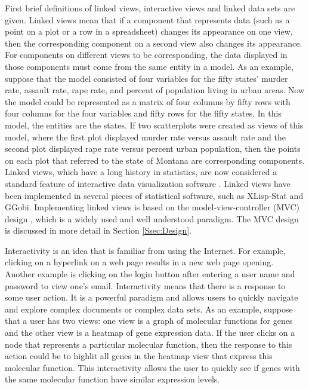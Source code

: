 \documentclass{article}[11pt]
\begin{document}
First brief definitions of linked views, interactive views and linked data
sets are given.  Linked views mean that if a component that represents
data (such as a point on a plot or a row in a spreadsheet) changes its
appearance on one view, then the corresponding component on a second view
also changes its appearance.  For components on different views to be
corresponding, the data displayed in those components must come from the same
entity in a model.  As an example, suppose that the model consisted of four
variables for the fifty states' murder rate, assault rate, rape rate, and
percent of population living in urban areas.  Now the model could be
represented as a matrix of four columns by fifty rows with four columns for
the four variables and fifty rows for the fifty states.  In this model, the
entities are the states.  If two scatterplots were created as views of
this model, where the first plot displayed murder rate versus assault rate and
the second plot displayed rape rate versus percent urban population, then the
points on each plot that referred to the state of Montana are
corresponding components.   Linked views, which have a long history in
statistics, are now considered a standard feature of interactive data
visualization software \cite{GGobi}.  Linked views have been implemented in
several pieces of statistical software, such as XLisp-Stat and GGobi.
Implementing linked views is based on the model-view-controller (MVC) design
\cite{DesignPatterns}, which is a widely used and well understood paradigm.
The MVC design is discussed in more detail in Section \ref{Ssec:Design}.

Interactivity is an idea that is familiar from using the Internet.  For
example, clicking on a hyperlink on a web page results in a new web page
opening.  Another example is clicking on the login button after entering a
user name and password to view one's email.  Interactivity means that there is
a response to some user action.  It is a powerful paradigm and allows users to
quickly navigate and explore complex documents or complex data sets.  As an
example, suppose that a user has two views: one view is a graph of molecular
functions for genes and the other view is a heatmap of gene expression data.
If the user clicks on a node that represents a particular molecular function,
then the response to this action could be to highlit all genes in the heatmap
view that express this molecular function.  This interactivity allows the
user to quickly see if genes with the same molecular function have similar
expression levels. 
\end{document}
